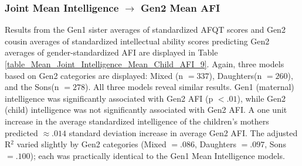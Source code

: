 \subsubsection{Joint Mean Intelligence $\rightarrow$ Gen2 Mean AFI} Results from the Gen1 sister averages of standardized AFQT scores and Gen2 cousin averages of standardized intellectual ability scores predicting Gen2 averages of gender-standardized AFI are displayed in Table \ref{table_Mean_Joint_Intelligence_Mean_Child_AFI_9}. Again, three models based on Gen2 categories are displayed: Mixed (n $= 337$), Daughters(n $= 260$), and the Sons(n $= 278$). All three models reveal similar results. Gen1 (maternal) intelligence was significantly associated with Gen2 AFI (p $< .01$), while Gen2 (child) intelligence was not significantly associated with Gen2 AFI. A one unit increase in the average standardized intelligence of the children's mothers predicted $\approx .014$ standard deviation increase in average Gen2 AFI. The adjusted R$^{2}$ varied slightly by Gen2 categories (Mixed $= .086$, Daughters $= .097$, Sons $= .100$); each was practically identical to the Gen1 Mean Intelligence models.

